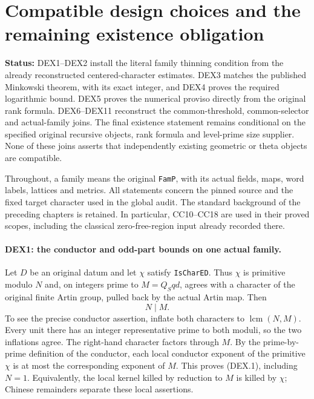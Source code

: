 \documentclass[11pt,a4paper]{article}
\numberwithin{equation}{section}
\theoremstyle{remark}\newtheorem{remark}[theorem]{Remark}
\newcommand{\status}[1]{\textbf{Status:} #1}
\begin{document}
\section{Compatible design choices and the remaining existence obligation}
\label{sec:design-existence-v031}

\status{DEX1--DEX2 install the literal family thinning condition from the
already reconstructed centered-character estimates. DEX3 matches the
published Minkowski theorem, with its exact integer, and DEX4 proves the
required logarithmic bound. DEX5 proves the numerical proviso directly
from the original rank formula. DEX6--DEX11 reconstruct the common-threshold,
common-selector and actual-family joins. The final existence statement
remains conditional on the specified original recursive objects, rank
formula and level-prime size supplier. None of these joins asserts that
independently existing geometric or theta objects are compatible.}

Throughout, a family means the original \texttt{FamP}, with its actual
fields, maps, word labels, lattices and metrics. All statements concern the
pinned source and the fixed target character used in the global audit.
The standard background of the preceding chapters is retained. In
particular, CC10--CC18 are used in their proved scopes, including the
classical zero-free-region input already recorded there.

\paragraph{DEX1: the conductor and odd-part bounds on one actual family.}
\label{claim:DEX1}
Let $D$ be an original datum and let $\chi$ satisfy
\texttt{IsCharED}. Thus $\chi$ is primitive modulo $N$ and, on
integers prime to $M=Q_Sqd$, agrees with a character of the original
finite Artin group, pulled back by the actual Artin map. Then
\[
                         N\mid M.                         \tag{DEX.1}
\]
To see the precise conductor assertion, inflate both characters to
$\operatorname{lcm}(N,M)$. Every unit there has an integer representative
prime to both moduli, so the two inflations agree. The right-hand
character factors through $M$. By the prime-by-prime definition of the
conductor, each local conductor exponent of the primitive $\chi$ is at
most the corresponding exponent of $M$. This proves (DEX.1), including
$N=1$. Equivalently, the local kernel killed by reduction to $M$ is
killed by $\chi$; Chinese remainders separate these local assertions.
\end{document}
